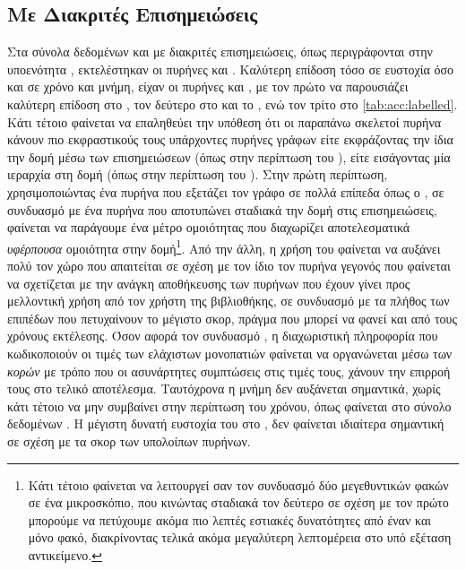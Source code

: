 \subsection{Με Διακριτές Επισημειώσεις}
Στα σύνολα δεδομένων  και  με διακριτές επισημειώσεις, όπως περιγράφονται στην υποενότητα \label{ssec:lab}, εκτελέστηκαν οι πυρήνες  και .
Καλύτερη επίδοση τόσο σε ευστοχία όσο και σε χρόνο και μνήμη, είχαν οι πυρήνες  και , με τον πρώτο να παρουσιάζει καλύτερη επίδοση στο , τον δεύτερο στο  και το , ενώ τον τρίτο στο  \ref{tab:acc:labelled}.
Κάτι τέτοιο φαίνεται να επαληθεύει την υπόθεση ότι οι παραπάνω σκελετοί πυρήνα κάνουν πιο εκφραστικούς τους υπάρχοντες πυρήνες γράφων είτε εκφράζοντας την ίδια την δομή μέσω των επισημειώσεων (όπως στην περίπτωση του ), είτε εισάγοντας μία ιεραρχία στη δομή (όπως στην περίπτωση του ).
Στην πρώτη περίπτωση, χρησιμοποιώντας ένα πυρήνα που εξετάζει τον γράφο σε πολλά επίπεδα όπως ο , σε συνδυασμό με ένα πυρήνα που αποτυπώνει σταδιακά την δομή στις επισημειώσεις, φαίνεται να παράγουμε ένα μέτρο ομοιότητας που διαχωρίζει αποτελεσματικά \textit{υφέρπουσα} ομοιότητα στην δομή\footnote{Κάτι τέτοιο φαίνεται να λειτουργεί σαν τον συνδυασμό δύο μεγεθυντικών φακών σε ένα μικροσκόπιο, που κινώντας σταδιακά τον δεύτερο σε σχέση με τον πρώτο μπορούμε να πετύχουμε ακόμα πιο λεπτές εστιακές δυνατότητες από έναν και μόνο φακό, διακρίνοντας τελικά ακόμα μεγαλύτερη λεπτομέρεια στο υπό εξέταση αντικείμενο.}.
Από την άλλη, η χρήση του  φαίνεται να αυξάνει πολύ τον χώρο που απαιτείται σε σχέση με τον ίδιο τον πυρήνα  γεγονός που φαίνεται να σχετίζεται με την ανάγκη αποθήκευσης των πυρήνων  που έχουν γίνει  προς μελλοντική χρήση από τον χρήστη της βιβλιοθήκης, σε συνδυασμό με τα πλήθος των επιπέδων που πετυχαίνουν το μέγιστο σκορ, πράγμα που μπορεί να φανεί και από τους χρόνους εκτέλεσης.
Όσον αφορά τον συνδυασμό , η διαχωριστική πληροφορία που κωδικοποιούν οι τιμές των ελάχιστων μονοπατιών φαίνεται να οργανώνεται μέσω των \textit{κορών} με τρόπο που οι ασυνάρτητες συμπτώσεις στις τιμές τους, χάνουν την επιρροή τους στο τελικό αποτέλεσμα.
Ταυτόχρονα η μνήμη δεν αυξάνεται σημαντικά, χωρίς κάτι τέτοιο να μην συμβαίνει στην περίπτωση του χρόνου, όπως φαίνεται στο σύνολο δεδομένων .
Η μέγιστη δυνατή ευστοχία του  στο , δεν φαίνεται ιδιαίτερα σημαντική σε σχέση με τα σκορ των υπολοίπων πυρήνων.

